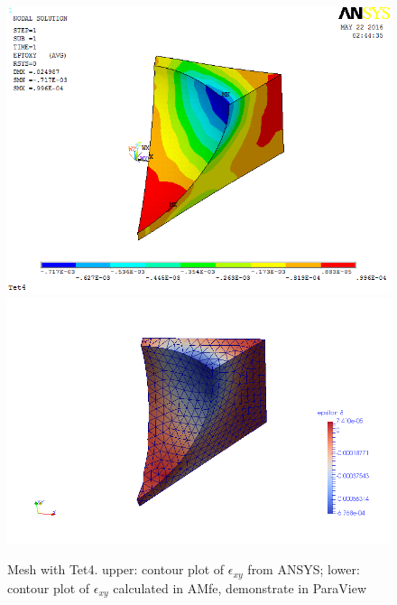 \begin{figure}[htbp]
	\begin{center}
		\includegraphics[width=13cm,clip]{Tet4Exy.png} 		
		\includegraphics[width=13cm,clip]{Tet4ExyP.png} 		
		\caption{Mesh with Tet4. upper: contour plot of $\epsilon_{xy}$ from ANSYS; lower: contour plot of $\epsilon_{xy}$ calculated in AMfe, demonstrate in ParaView} \label{fig: Tet4Exy}
	\end{center}
\end{figure}
\clearpage 

